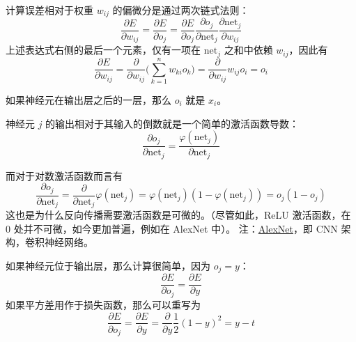 \documentclass[../studies-ml.tex]{subfiles}
\begin{document}
\begin{enumerate}[I]
        计算误差相对于权重 $w_{ij}$ 的偏微分是通过两次链式法则：
        \begin{equation}
          \frac{\partial E}{\partial w_{ij}} = \frac{\partial E}{\partial o_j} =
          \frac{\partial E}{\partial o_j} \frac{\partial o_j}{\partial\mathrm{net}_j}
          \frac{\partial \mathrm{net}_j}{\partial w_{ij}}
          \tag{I}
        \end{equation}
        上述表达式右侧的最后一个元素，仅有一项在 $\mathrm{net}_j$ 之和中依赖 $w_{ij}$，因此有
        \begin{equation}
          \frac{\partial E}{\partial w_{ij}} = \frac{\partial}{\partial w_{ij}}
          \Biggl(\sum_{k=1}^{n} w_{ki} o_k\Biggr) = \frac{\partial}{\partial w_{ij}} w_{ij} o_i = o_i
          \tag{II}
        \end{equation}

        如果神经元在输出层之后的一层，那么 $o_i$ 就是 $x_i$。

        神经元 $j$ 的输出相对于其输入的倒数就是一个简单的激活函数导数：
        \begin{equation}
          \frac{\partial o_j}{\partial\mathrm{net}_j}=\frac{\varphi(\mathrm{net}_j)}{\partial\mathrm{net}_j}
          \tag{III}
        \end{equation}

        而对于对数激活函数而言有
        \[
          \frac{\partial o_j}{\partial\mathrm{net}_j}=\frac{\partial}{\partial\mathrm{net}_j}\varphi(\mathrm{net}_j)=
          \varphi(\mathrm{net}_j)(1-\varphi(\mathrm{net}_j))=o_j(1-o_j)
        \]
        这也是为什么反向传播需要激活函数是可微的。（尽管如此，ReLU 激活函数，在 0 处并不可微，如今更加普遍，例如在 AlexNet 中）。
        注：\href{https://en.wikipedia.org/wiki/AlexNet}{AlexNet}，即 CNN 架构，卷积神经网络。

        如果神经元位于输出层，那么计算很简单，因为 $o_j = y$：
        \begin{equation}
          \frac{\partial E}{\partial o_j} = \frac{\partial E}{\partial y}
          \tag{IV}
        \end{equation}
        如果平方差用作于损失函数，那么可以重写为
        \[
          \frac{\partial E}{\partial o_j} = \frac{\partial E}{\partial y} =
          \frac{\partial}{\partial y} \frac{1}{2} (1-y)^2 = y - t
        \]


\end{enumerate}
\end{document}
